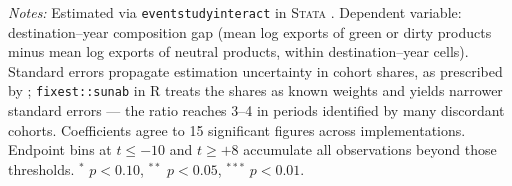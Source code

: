\begin{table}[htbp]
\begin{threeparttable}
\begin{tablenotes}[flushleft]
\item \emph{Notes:} Estimated via \texttt{eventstudyinteract} in \textsc{Stata} \citep{sun2021}. Dependent variable: destination--year composition gap (mean log exports of green or dirty products minus mean log exports of neutral products, within destination--year cells). Standard errors propagate estimation uncertainty in cohort shares, as prescribed by \citet{sun2021}; \texttt{fixest::sunab} in \textsc{R} treats the shares as known weights and yields narrower standard errors --- the ratio reaches 3--4 in periods identified by many discordant cohorts. Coefficients agree to 15 significant figures across implementations. Endpoint bins at $t\leq -10$ and $t\geq +8$ accumulate all observations beyond those thresholds. $^{*}$ $p<0.10$, $^{**}$ $p<0.05$, $^{***}$ $p<0.01$.
\end{tablenotes}
\end{threeparttable}
\end{table}
